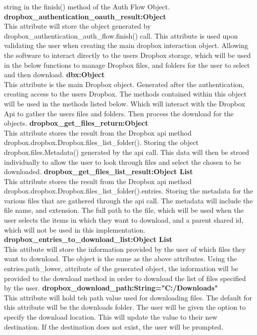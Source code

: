     string in the finish() method of the Auth Flow Object. 
\textbf{dropbox\_authentication\_oauth\_result:Object} \\
    This attribute will store the object generated by dropbox\_authentication\_auth\_flow.finish() call. This attribute is used upon validating
    the user when creating the main dropbox interaction object. Allowing the software to interact directly to the users Dropbox storage, 
    which will be used in the below functions to manage Dropbox files, and folders for the user to select and then download. 
\textbf{dbx:Object} \\
    This attribute is the main Dropbox object. Generated after the authentication, creating access to the users Dropbox. The methods contained 
    within this object will be used in the methods listed below. Which will interact with the Dropbox Api to gather the users files and folders.
    Then process the download for the objects. 
\textbf{dropbox\_get\_files\_return:Object} \\
    This attribute stores the result from the Dropbox api method dropbox.dropbox.Dropbox.files\_list\_folder(). Storing the object 
    dropbox.files.Metadata() generated by the api call. This data will then be stroed individually to allow the user to look through 
    files and select the chosen to be downloaded.
\textbf{dropbox\_get\_files\_list\_result:Object List} \\
    This attribute stores the result from the Dropbox api method dropbox.dropbox.Dropbox.files_list_folder().entries. Storing the metadata for 
    the various files that are gathered through the api call. The metadata will include the file name, and extension. The full path to the file, 
    which will be used when the user selects the items in which they want to download, and a parent shared id, which will not be used in this 
    implementation.
\textbf{dropbox\_entries\_to\_download\_list:Object List} \\
    This attibute will store the information provided by the user of which files they want to download. The object is the same as the above 
    attributes. Using the entries.path_lower, attribute of the generated object, the information will be provided to the download method in 
    order to download the list of files specified by the user.
\textbf{dropbox\_download\_path:String="C:/Downloads"} \\
    This attribute will hold teh path value used for downloading files. The default for this attribute will be the downloads folder. The user 
    will be given the option to specify the download location. This will update the value to their new destination. If the destination does 
    not exist, the user will be prompted.

